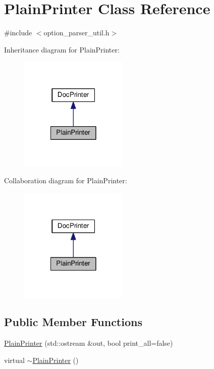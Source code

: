 \hypertarget{classPlainPrinter}{\section{Plain\-Printer Class Reference}
\label{classPlainPrinter}
}


{\ttfamily \#include $<$option\-\_\-parser\-\_\-util.\-h$>$}



Inheritance diagram for Plain\-Printer\-:
\nopagebreak
\begin{figure}[H]
\begin{center}
\leavevmode
\includegraphics[width=146pt]{classPlainPrinter__inherit__graph}
\end{center}
\end{figure}


Collaboration diagram for Plain\-Printer\-:
\nopagebreak
\begin{figure}[H]
\begin{center}
\leavevmode
\includegraphics[width=146pt]{classPlainPrinter__coll__graph}
\end{center}
\end{figure}
\subsection*{Public Member Functions}
\begin{DoxyCompactItemize}
\item 
\hyperlink{classPlainPrinter_ac684f1a647b7fcc61aa0ee5e9b21b251}{Plain\-Printer} (std\-::ostream \&out, bool print\-\_\-all=false)
\item 
virtual \hyperlink{classPlainPrinter_a440d4e4f1faec1b33a2583637bb91b56}{$\sim$\-Plain\-Printer} ()
\end{DoxyCompactItemize}
